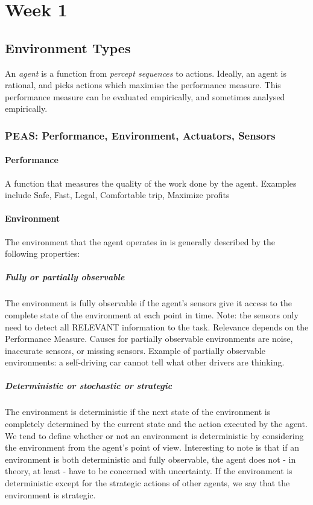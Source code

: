 \part{Week 1}
\chapter{Environment Types}
An \textit{agent} is a function from \textit{percept sequences} to actions.
Ideally, an agent is rational, and picks actions which maximise the performance
measure.
This performance measure can be evaluated empirically, and sometimes analysed
empirically.
\section[PEAS]{PEAS: Performance, Environment, Actuators, Sensors}
\subsection{Performance}
A function that measures the quality of the work done by the agent. Examples
include Safe, Fast, Legal, Comfortable trip, Maximize profits
\subsection{Environment}
The environment that the agent operates in is generally described by the following properties:
\subsubsection{Fully or partially observable}
The environment is fully observable if the agent's sensors give it access to
the complete state of the environment at each point in time. Note: the sensors
only need to detect all RELEVANT information to the task. Relevance depends on
the Performance Measure.
Causes for partially observable environments are noise, inaccurate sensors, or
missing sensors.
Example of partially observable environments: a self-driving car cannot tell what
other drivers are thinking.

\subsubsection{Deterministic or stochastic or strategic}
The environment is deterministic if the next state of the environment is
completely determined by the current state and the action executed by the
agent. We tend to define whether or not an environment is deterministic by
considering the environment from the agent's point of view. Interesting to note
is that if an environment is both deterministic and fully observable, the agent
does not - in theory, at least - have to be concerned with uncertainty.
If the environment is deterministic except for the strategic actions of other
agents, we say that the environment is strategic.

